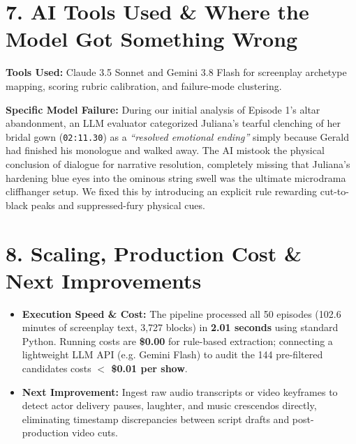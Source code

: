 \documentclass[10pt,a4paper]{article}
\begin{document}
\section*{7. AI Tools Used \& Where the Model Got Something Wrong}
\textbf{Tools Used:} Claude 3.5 Sonnet and Gemini 3.8 Flash for screenplay archetype mapping, scoring rubric calibration, and failure-mode clustering.

\textbf{Specific Model Failure:} During our initial analysis of Episode 1's altar abandonment, an LLM evaluator categorized Juliana's tearful clenching of her bridal gown (\texttt{02:11.30}) as a \textit{``resolved emotional ending''} simply because Gerald had finished his monologue and walked away. The AI mistook the physical conclusion of dialogue for narrative resolution, completely missing that Juliana's hardening blue eyes into the ominous string swell was the ultimate microdrama cliffhanger setup. We fixed this by introducing an explicit rule rewarding cut-to-black peaks and suppressed-fury physical cues.

\section*{8. Scaling, Production Cost \& Next Improvements}
\begin{itemize}[leftmargin=1.2em]
    \item \textbf{Execution Speed \& Cost:} The pipeline processed all 50 episodes (102.6 minutes of screenplay text, 3,727 blocks) in \textbf{2.01 seconds} using standard Python. Running costs are \textbf{\$0.00} for rule-based extraction; connecting a lightweight LLM API (e.g. Gemini Flash) to audit the 144 pre-filtered candidates costs \textbf{$<$ \$0.01 per show}.
    \item \textbf{Next Improvement:} Ingest raw audio transcripts or video keyframes to detect actor delivery pauses, laughter, and music crescendos directly, eliminating timestamp discrepancies between script drafts and post-production video cuts.
\end{itemize}
\end{document}
